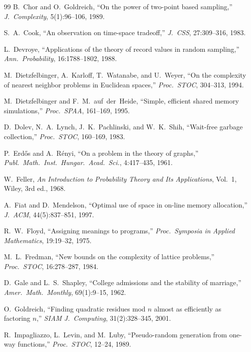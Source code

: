 \documentclass[twoside,12pt]{book}
\theoremstyle{plain}
\theoremstyle{definition}
\theoremstyle{remark}
\begin{document}
\begin{thebibliography}{99}
B.~Chor and O.~Goldreich,
``On the power of two-point based sampling,''
\textit{J.~Complexity}, 5(1):96--106, 1989.

S.~A.~Cook,
``An observation on time-space tradeoff,''
\textit{J.~CSS}, 27:309--316, 1983.

L.~Devroye,
``Applications of the theory of record values in random sampling,''
\textit{Ann.~Probability}, 16:1788--1802, 1988.

M.~Dietzfelbinger, A.~Karloff, T.~Watanabe, and U.~Weyer,
``On the complexity of nearest neighbor problems in Euclidean spaces,''
\textit{Proc.~STOC}, 304--313, 1994.

M.~Dietzfelbinger and F.~M.~auf~der~Heide,
``Simple, efficient shared memory simulations,''
\textit{Proc.~SPAA}, 161--169, 1995.

D.~Dolev, N.~A.~Lynch, J.~K.~Pachlinski, and W.~K.~Shih,
``Wait-free garbage collection,''
\textit{Proc.~STOC}, 160--169, 1983.

P.~Erd\H{o}s and A.~R\'{e}nyi,
``On a problem in the theory of graphs,''
\textit{Publ.~Math.~Inst.~Hungar.~Acad.~Sci.}, 4:417--435, 1961.

W.~Feller,
\textit{An Introduction to Probability Theory and Its Applications}, Vol.~1,
Wiley, 3rd ed., 1968.

A.~Fiat and D.~Mendelson,
``Optimal use of space in on-line memory allocation,''
\textit{J.~ACM}, 44(5):837--851, 1997.

R.~W.~Floyd,
``Assigning meanings to programs,''
\textit{Proc.~Symposia in Applied Mathematics}, 19:19--32, 1975.

M.~L.~Fredman,
``New bounds on the complexity of lattice problems,''
\textit{Proc.~STOC}, 16:278--287, 1984.

D.~Gale and L.~S.~Shapley,
``College admissions and the stability of marriage,''
\textit{Amer.~Math.~Monthly}, 69(1):9--15, 1962.

O.~Goldreich,
``Finding quadratic residues mod $n$ almost as efficiently as factoring $n$,''
\textit{SIAM J.~Computing}, 31(2):328--345, 2001.

R.~Impagliazzo, L.~Levin, and M.~Luby,
``Pseudo-random generation from one-way functions,''
\textit{Proc.~STOC}, 12--24, 1989.


\end{thebibliography}
\end{document}
